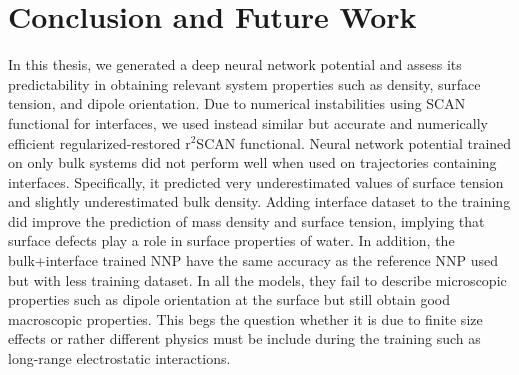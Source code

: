 \chapter{Conclusion and Future Work}

In this thesis, we generated a deep neural network potential and assess its
predictability in obtaining relevant system properties such as density, surface
tension, and dipole orientation. Due to numerical instabilities using SCAN functional for interfaces, we used instead  similar  but accurate and numerically efficient regularized-restored r$^2$SCAN functional. Neural network potential trained on only bulk
systems did not perform well when used on trajectories containing interfaces.
Specifically, it predicted very underestimated values of surface tension and
slightly underestimated bulk density. Adding interface dataset to the training
did improve the prediction of mass density and surface tension, implying that surface defects
play a role in surface properties of water. In addition, the bulk+interface trained NNP have the same accuracy as the reference NNP used but with less training dataset. In all the models, they fail to describe microscopic properties such as dipole orientation at the surface but still obtain good macroscopic properties. This begs the question whether it is due to finite size effects or rather different physics must be include during the training such as long-range electrostatic interactions.
